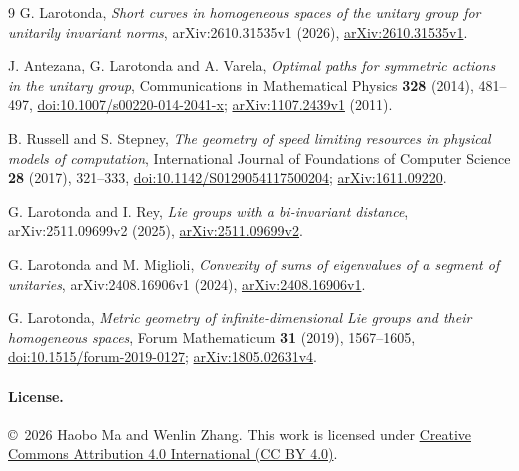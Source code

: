\documentclass[11pt]{article}
\begin{document}
\begin{thebibliography}{9}
G. Larotonda, \emph{Short curves in homogeneous spaces of the unitary
group for unitarily invariant norms}, arXiv:2610.31535v1 (2026),
\href{https://arxiv.org/abs/2610.31535v1}{arXiv:2610.31535v1}.

J. Antezana, G. Larotonda and A. Varela,
\emph{Optimal paths for symmetric actions in the unitary group},
Communications in Mathematical Physics \textbf{328} (2014), 481--497,
\href{https://doi.org/10.1007/s00220-014-2041-x}{doi:10.1007/s00220-014-2041-x};
\href{https://arxiv.org/abs/1107.2439v1}{arXiv:1107.2439v1} (2011).

B. Russell and S. Stepney,
\emph{The geometry of speed limiting resources in physical models of computation},
International Journal of Foundations of Computer Science \textbf{28} (2017), 321--333,
\href{https://doi.org/10.1142/S0129054117500204}{doi:10.1142/S0129054117500204};
\href{https://arxiv.org/abs/1611.09220}{arXiv:1611.09220}.

G. Larotonda and I. Rey, \emph{Lie groups with a bi-invariant distance},
arXiv:2511.09699v2 (2025),
\href{https://arxiv.org/abs/2511.09699v2}{arXiv:2511.09699v2}.

G. Larotonda and M. Miglioli, \emph{Convexity of sums of eigenvalues of a
segment of unitaries}, arXiv:2408.16906v1 (2024),
\href{https://arxiv.org/abs/2408.16906v1}{arXiv:2408.16906v1}.

G. Larotonda, \emph{Metric geometry of infinite-dimensional Lie groups
and their homogeneous spaces}, Forum Mathematicum \textbf{31} (2019),
1567--1605,
\href{https://doi.org/10.1515/forum-2019-0127}{doi:10.1515/forum-2019-0127};
\href{https://arxiv.org/abs/1805.02631v4}{arXiv:1805.02631v4}.
\end{thebibliography}
\paragraph{License.} \copyright\ 2026 Haobo Ma and Wenlin Zhang.
This work is licensed under
\href{https://creativecommons.org/licenses/by/4.0/}{Creative Commons Attribution 4.0 International (CC BY 4.0)}.
\end{document}
